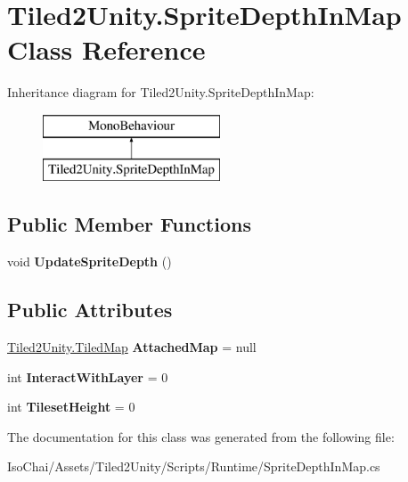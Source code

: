 \hypertarget{class_tiled2_unity_1_1_sprite_depth_in_map}{}\section{Tiled2\+Unity.\+Sprite\+Depth\+In\+Map Class Reference}
\label{class_tiled2_unity_1_1_sprite_depth_in_map}
Inheritance diagram for Tiled2\+Unity.\+Sprite\+Depth\+In\+Map\+:\begin{figure}[H]
\begin{center}
\leavevmode
\includegraphics[height=2.000000cm]{class_tiled2_unity_1_1_sprite_depth_in_map}
\end{center}
\end{figure}
\subsection*{Public Member Functions}
\begin{DoxyCompactItemize}
\item 
\mbox{\label{class_tiled2_unity_1_1_sprite_depth_in_map_a79ca9fab2c970a7b1b38ac517b1b7e4f}} 
void {\bfseries Update\+Sprite\+Depth} ()
\end{DoxyCompactItemize}
\subsection*{Public Attributes}
\begin{DoxyCompactItemize}
\item 
\mbox{\label{class_tiled2_unity_1_1_sprite_depth_in_map_a5dd8f08b23b777e39c8b487c83f031d5}} 
\mbox{\hyperlink{class_tiled2_unity_1_1_tiled_map}{Tiled2\+Unity.\+Tiled\+Map}} {\bfseries Attached\+Map} = null
\item 
\mbox{\label{class_tiled2_unity_1_1_sprite_depth_in_map_aa4341e388711f701a946f7cbd28ca0ca}} 
int {\bfseries Interact\+With\+Layer} = 0
\item 
\mbox{\label{class_tiled2_unity_1_1_sprite_depth_in_map_a0f4e0cf735c9ec63f3362751b89edd60}} 
int {\bfseries Tileset\+Height} = 0
\end{DoxyCompactItemize}


The documentation for this class was generated from the following file\+:\begin{DoxyCompactItemize}
\item 
Iso\+Chai/\+Assets/\+Tiled2\+Unity/\+Scripts/\+Runtime/Sprite\+Depth\+In\+Map.\+cs\end{DoxyCompactItemize}
